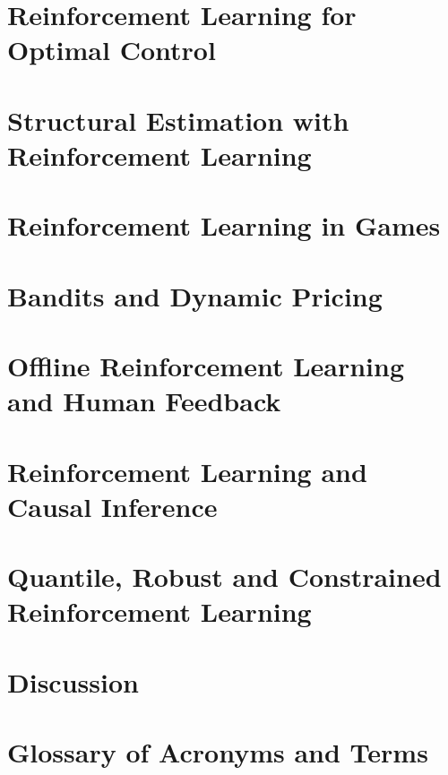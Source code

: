 \documentclass[11pt,notitlepage,a4paper]{article}
\begin{document}
% 

\section{Reinforcement Learning for Optimal Control}
\label{section:applications}


\section{Structural Estimation with Reinforcement Learning}
\label{section:rl_econ_models}


\section{Reinforcement Learning in Games}
\label{section:rl_games}


\section{Bandits and Dynamic Pricing}
\label{section:bandits}


\section{Offline Reinforcement Learning and Human Feedback}
\label{section:offline_rl}


\section{Reinforcement Learning and Causal Inference}
\label{section:causal_rl}


\section{Quantile, Robust and Constrained Reinforcement Learning}
\label{section:dist_robust_constrained}


\section{Discussion}
\label{section:conclusion}






\appendix
\section{Glossary of Acronyms and Terms}
\label{appendix:glossary}

\end{document}
